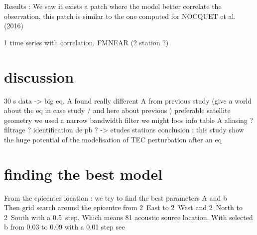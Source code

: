 \documentclass{gji}
\begin{document}
Results :
        We saw it exists a patch where the model better correlate the observation, this patch is similar to the one computed for NOCQUET et al. (2016) 

        1 time series with correlation, FMNEAR (2 station ?)
        
        
        \section{discussion}

        30 s data -> big eq. 
        A found really different A from previous study (give a world about the eq in case study / and here about previous ) 
        preferable satellite geometry 
        we used a narrow bandwidth filter we might loos info
table A
aliasing ?
filtrage ? 
identification de pb ? -> etudes stations 
conclusion : 
        this study show the huge potential of the modelisation of TEC perturbation after an eq
        


\section{finding the best model}
From the epicenter location : we try to find the best parameters A and b \\
Then grid search around the epicentre from 2~\degree East to 2~\degree West and 2~\degree North to 2~\degree South with a 0.5~\degree step. Which means 81 acoustic source location. With selected b from 0.03 to 0.09 with a 0.01 step see \cite{Astafyeva2011} 

\todo[inline,caption={bibtex Lee 2018}]{
}
\todo[inline,caption={bibtex Astafyeva 2013}]{%
	}
    
\end{document}
